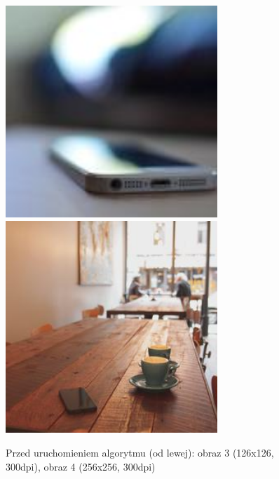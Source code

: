 \documentclass[a4paper,12pt]{book}
\begin{document}
\begin{figure}
	\caption{Przed uruchomieniem algorytmu (od lewej): obraz 3 (126x126, 300dpi), obraz 4 (256x256, 300dpi)}
	\includegraphics[width=8cm, height=8cm]{phone-unmodified.jpg}
	\includegraphics[width=8cm, height=8cm]{coffee-unmodified.jpg}
\end{figure}
\end{document}
